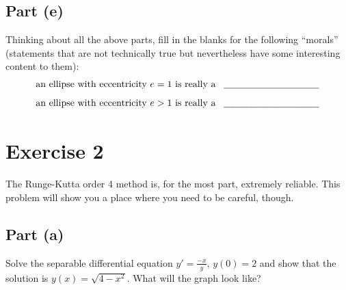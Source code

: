 \documentclass[letterpaper, 12pt]{amsart}
\theoremstyle{definition}  							%
\newcommand{\blank}{\underbar{\ \ }}          	%
\begin{document}
		\subsection*{Part (e)}
		Thinking about all the above parts, fill in the blanks for the following ``morals'' (statements that are not technically true but nevertheless have some interesting content to them):
		$$ \text{an ellipse with eccentricity $e = 1$ is really a \, $\blank\blank\blank\blank\blank\blank\blank\blank\blank\blank\blank\blank\blank\blank\blank$}$$
		\vspace{2mm}
		$$ \text{an ellipse with eccentricity $e > 1$ is really a \, $\blank\blank\blank\blank\blank\blank\blank\blank\blank\blank\blank\blank\blank\blank\blank$}$$

	\section*{Exercise 2}
	The Runge-Kutta order 4 method is, for the most part, extremely reliable. 
	This problem will show you a place where you need to be careful, though.
		\subsection*{Part (a)}
		Solve the separable differential equation $y' = \tfrac{-x}{y}, \, y(0) = 2$ and show that the solution is $y(x) = \sqrt{4 - x^2}$. 
		What will the graph look like?
\end{document}
